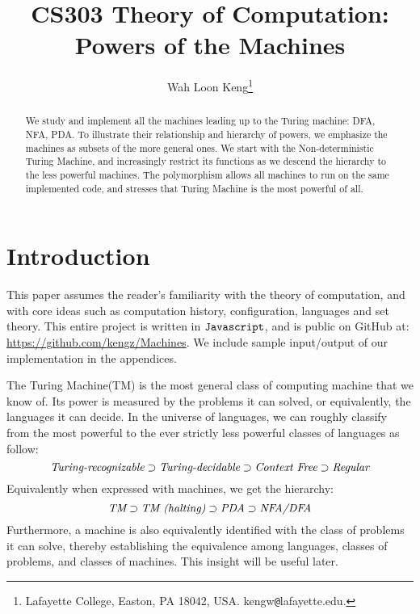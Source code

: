 \documentclass[12pt]{article}  %
\begin{document}
\title{CS303 Theory of Computation:\\ Powers of the Machines}

\author{
{Wah Loon Keng}\thanks{
Lafayette College,
Easton, PA 18042, USA.
kengw{\tt @}lafayette.edu.}
}
\maketitle

\begin{abstract}
We study and implement all the machines leading up to the Turing machine: DFA, NFA, PDA. To illustrate their relationship and hierarchy of powers, we emphasize the machines as subsets of the more general ones. We start with the Non-deterministic Turing Machine, and increasingly restrict its functions as we descend the hierarchy to the less powerful machines. The polymorphism allows all machines to run on the same implemented code, and stresses that Turing Machine is the most powerful of all.
\end{abstract}







\section{Introduction} \label{intro}


This paper assumes the reader's familiarity with the theory of computation, and with core ideas such as computation history, configuration, languages and set theory. This entire project is written in ${\tt Javascript}$, and is public on GitHub at: \url{https://github.com/kengz/Machines}. We include sample input/output of our implementation in the appendices.

The Turing Machine(TM) is the most general class of computing machine that we know of. Its power is measured by the problems it can solved, or equivalently, the languages it can decide. In the universe of languages, we can roughly classify from the most powerful to the ever strictly less powerful classes of languages as follow:
$$\emph{Turing-recognizable} \supset \emph{Turing-decidable} \supset \emph{Context Free} \supset \emph{Regular}$$
Equivalently when expressed with machines, we get the hierarchy:
$$\emph{TM} \supset \emph{TM (halting)} \supset \emph{PDA} \supset \emph{NFA/DFA}$$
Furthermore, a machine is also equivalently identified with the class of problems it can solve, thereby establishing the equivalence among languages, classes of problems, and classes of machines. This insight will be useful later.
\end{document}
